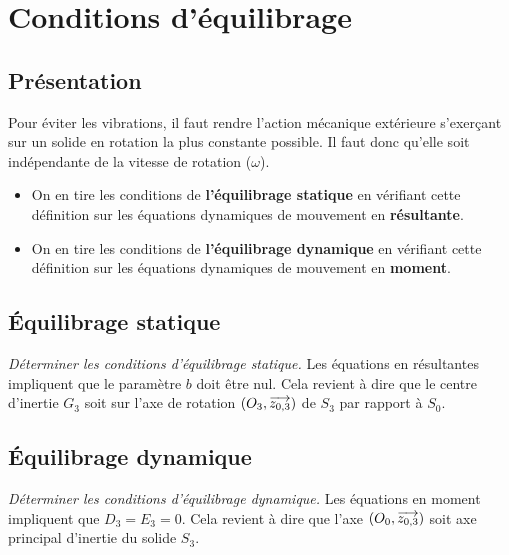 \documentclass[10pt,fleqn]{article} %
\begin{document}
\section{Conditions d'équilibrage}

\subsection{Présentation}

\begin{definition}
Pour éviter les vibrations, il faut rendre l'action mécanique extérieure s'exerçant sur un solide en rotation la plus constante possible. Il faut donc qu'elle soit indépendante de la vitesse de rotation ($\omega$).
\begin{itemize}
\item On en tire les conditions de \textbf{l'équilibrage statique} en vérifiant cette définition sur les équations dynamiques de mouvement en \textbf{résultante}.
\item On en tire les conditions de \textbf{l'équilibrage dynamique} en vérifiant cette définition sur les équations dynamiques de mouvement en \textbf{moment}.
\end{itemize}
 
\end{definition}

\subsection{Équilibrage statique}

\begin{exemple}

\textit{Déterminer les conditions d'équilibrage statique.}
\ifprof
Les équations en résultantes impliquent que le paramètre $b$ doit être nul. Cela revient à dire que le centre d'inertie $G_3$ soit sur l'axe de rotation $\left(O_3,\overrightarrow{z_{0,3}}\right)$ de $S_3$ par rapport à $S_0$.
\else
\fi
\end{exemple}


\subsection{Équilibrage dynamique}

\begin{exemple}
\textit{Déterminer les conditions d'équilibrage dynamique.}
\ifprof
Les équations en moment impliquent que $D_3=E_3=0$.
Cela revient à dire que l'axe $\left(O_0,\overrightarrow{{z_{0,3}}}\right)$ soit axe principal d'inertie du solide $S_3$.
\else
\fi
\end{exemple}
\end{document}
